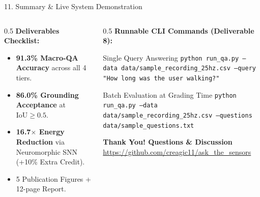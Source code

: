 \documentclass[aspectratio=169]{beamer}
\begin{document}
\begin{frame}{11. Summary \& Live System Demonstration}
\begin{columns}
\begin{column}{0.5\textwidth}
\textbf{Deliverables Checklist:}
\begin{itemize}
    \item[\checkmark] \textbf{91.3\% Macro-QA Accuracy} across all 4 tiers.
    \item[\checkmark] \textbf{86.0\% Grounding Acceptance} at $\text{IoU} \ge 0.5$.
    \item[\checkmark] \textbf{16.7$\times$ Energy Reduction} via Neuromorphic SNN (+10\% Extra Credit).
    \item[\checkmark] 5 Publication Figures + 12-page Report.
\end{itemize}
\end{column}
\begin{column}{0.5\textwidth}
\textbf{Runnable CLI Commands (Deliverable 8):}
\scriptsize
\begin{exampleblock}{Single Query Answering}
\texttt{python run\_qa.py --data data/sample\_recording\_25hz.csv --query "How long was the user walking?"}
\end{exampleblock}
\begin{exampleblock}{Batch Evaluation at Grading Time}
\texttt{python run\_qa.py --data data/sample\_recording\_25hz.csv --questions data/sample\_questions.txt}
\end{exampleblock}
\normalsize
\begin{center}
\textbf{Thank You! Questions \& Discussion}\\
\footnotesize \url{https://github.com/creagic11/ask_the_sensors}
\end{center}
\end{column}
\end{columns}
\end{frame}
\end{document}
